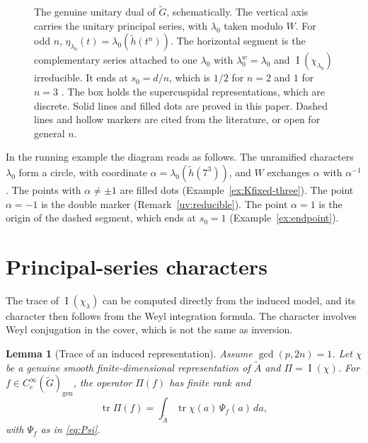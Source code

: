 \documentclass[12pt,letterpaper]{article}
\numberwithin{equation}{section}
\theoremstyle{plain}
\newtheorem{lemma}[theorem]{Lemma}
\theoremstyle{definition}
\theoremstyle{remark}
\newcommand{\Gt}{\widetilde G}
\newcommand{\At}{\widetilde A}
\newcommand{\hl}{\tilde h}
\newcommand{\gen}{\mathrm{gen}}
\DeclareMathOperator{\PI}{I}
\DeclareMathOperator{\tr}{tr}
\begin{document}
\begin{figure}[ht]
\caption{The genuine unitary dual of $\Gt$, schematically. The
vertical axis carries the unitary principal series, with $\lambda_0$
taken modulo $W$. For odd $n$, $\eta_{\lambda_0}(t)=\lambda_0(\hl(t^n))$.
The horizontal segment is the complementary series attached to one
$\lambda_0$ with $\lambda_0^w=\lambda_0$ and $\PI(\chi_{\lambda_0})$
irreducible. It ends at $s_0=d/n$, which is $1/2$ for $n=2$
\cite{GS75,Ge76} and $1$ for $n=3$ \cite{Ar80}. The box holds the
supercuspidal representations, which are discrete. Solid lines and
filled dots are proved in this paper. Dashed lines and hollow markers
are cited from the literature, or open for general $n$.}
\label{fig:dual}
\end{figure}

In the running example the diagram reads as follows. The unramified
characters $\lambda_0$ form a circle, with coordinate
$\alpha=\lambda_0(\hl(7^3))$, and $W$ exchanges $\alpha$ with
$\alpha^{-1}$. The points with $\alpha\ne\pm1$ are filled dots
(Example~\ref{ex:Kfixed-three}). The point $\alpha=-1$ is the double
marker (Remark~\ref{uv:reducible}). The point $\alpha=1$ is the origin
of the dashed segment, which ends at $s_0=1$
(Example~\ref{ex:endpoint}).

\section{Principal-series characters}\label{sec:characters}

The trace of $\PI(\chi_\lambda)$ can be computed directly from the
induced model, and its character then follows from the Weyl
integration formula. The character involves Weyl conjugation in the
cover, which is not the same as inversion.

\begin{lemma}[Trace of an induced representation]
\label{lem:induced-trace}
Assume $\gcd(p,2n)=1$. Let $\chi$ be a genuine smooth
finite-dimensional representation of $\At$ and $\Pi=\PI(\chi)$. For
$f\in C_c^\infty(\Gt)_\gen$, the operator $\Pi(f)$ has finite rank and
\[
\tr\Pi(f)=\int_{\At}\tr\chi(a)\,\Psi_f(a)\,da ,
\]
with $\Psi_f$ as in \eqref{eq:Psi}.
\end{lemma}
\end{document}
